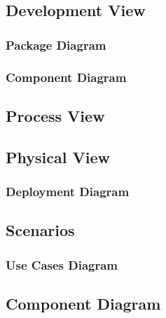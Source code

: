 \documentclass[12pt]{article}
\begin{document}
	\vspace{0.5cm}
	\subsection{Development View}
	\vspace{0.5cm}

	

	\vspace{0.5cm}
	\subsubsection{Package Diagram}


	\vspace{0.5cm}
	\subsubsection{Component Diagram}


	\vspace{0.5cm}
	\subsection{Process View}


	\vspace{0.5cm}
	\subsection {Physical View}


	\vspace{0.5cm}
	\subsubsection{Deployment Diagram}


	\vspace{0.5cm}
	\subsection{Scenarios}


	\vspace{0.5cm}
	\subsubsection{Use Cases Diagram}


	\vspace{0.5cm}
	\subsection {Component Diagram}
\end{document}

